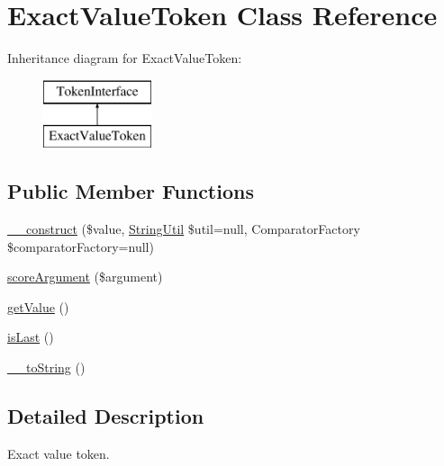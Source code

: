 \hypertarget{class_prophecy_1_1_argument_1_1_token_1_1_exact_value_token}{}\section{Exact\+Value\+Token Class Reference}
\label{class_prophecy_1_1_argument_1_1_token_1_1_exact_value_token}
Inheritance diagram for Exact\+Value\+Token\+:\begin{figure}[H]
\begin{center}
\leavevmode
\includegraphics[height=2.000000cm]{class_prophecy_1_1_argument_1_1_token_1_1_exact_value_token}
\end{center}
\end{figure}
\subsection*{Public Member Functions}
\begin{DoxyCompactItemize}
\item 
\mbox{\hyperlink{class_prophecy_1_1_argument_1_1_token_1_1_exact_value_token_afa2cfe5290253b1aaf1a42d726e9cff9}{\+\_\+\+\_\+construct}} (\$value, \mbox{\hyperlink{class_prophecy_1_1_util_1_1_string_util}{String\+Util}} \$util=null, Comparator\+Factory \$comparator\+Factory=null)
\item 
\mbox{\hyperlink{class_prophecy_1_1_argument_1_1_token_1_1_exact_value_token_a8d5bf47ab6eaa935458d5ad160e52822}{score\+Argument}} (\$argument)
\item 
\mbox{\hyperlink{class_prophecy_1_1_argument_1_1_token_1_1_exact_value_token_ac0bc18784b182c89fcfd276625aef435}{get\+Value}} ()
\item 
\mbox{\hyperlink{class_prophecy_1_1_argument_1_1_token_1_1_exact_value_token_ac72b8349b1340887fc1af30eca2b951c}{is\+Last}} ()
\item 
\mbox{\hyperlink{class_prophecy_1_1_argument_1_1_token_1_1_exact_value_token_a7516ca30af0db3cdbf9a7739b48ce91d}{\+\_\+\+\_\+to\+String}} ()
\end{DoxyCompactItemize}


\subsection{Detailed Description}
Exact value token.

